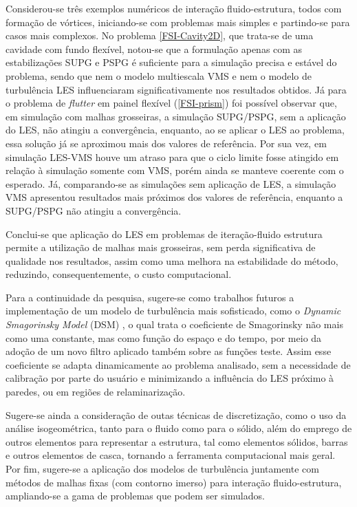 Considerou-se três exemplos numéricos de interação fluido-estrutura, todos com formação de vórtices, iniciando-se com problemas mais simples e partindo-se para casos mais complexos. No problema \ref{FSI-Cavity2D}, que trata-se de uma cavidade com fundo flexível, notou-se que a formulação apenas com as estabilizações SUPG e PSPG é suficiente para a simulação precisa e estável do problema, sendo que nem o modelo multiescala VMS e nem o modelo de turbulência LES influenciaram  significativamente nos resultados obtidos. Já para o problema de \textit{flutter} em painel flexível (\ref{FSI-prism}) foi possível observar que, em simulação com malhas grosseiras, a simulação SUPG/PSPG, sem a aplicação do LES, não atingiu a convergência, enquanto, ao se aplicar o LES ao problema, essa solução já se aproximou mais dos valores de referência. Por sua vez, em simulação LES-VMS houve um atraso para que o ciclo limite fosse atingido em relação à simulação somente com VMS, porém ainda se manteve coerente com o esperado. Já, comparando-se as simulações sem aplicação de LES, a simulação VMS apresentou resultados mais próximos dos valores de referência, enquanto a SUPG/PSPG não atingiu a convergência.

Conclui-se que aplicação do LES em problemas de iteração-fluido estrutura permite a utilização de malhas mais grosseiras, sem perda significativa de qualidade nos resultados, assim como uma melhora na estabilidade do método, reduzindo, consequentemente, o custo computacional.

Para a continuidade da pesquisa, sugere-se como trabalhos futuros a implementação de um modelo de turbulência mais sofisticado, como o \textit{Dynamic Smagorinsky Model} (DSM) \cite{germano1991dynamic}, o qual trata o coeficiente de Smagorinsky não mais como uma constante, mas como função do espaço e do tempo, por meio da adoção de um novo filtro aplicado também sobre as funções teste. Assim esse coeficiente se adapta dinamicamente ao problema analisado, sem a necessidade de calibração por parte do usuário e minimizando a influência do LES próximo à paredes, ou em regiões de relaminarização.

Sugere-se ainda a consideração de outas técnicas de discretização, como o uso da análise isogeométrica, tanto para o fluido como para o sólido, além do emprego de outros elementos para representar a estrutura, tal como elementos sólidos, barras e outros elementos de casca, tornando a ferramenta computacional mais geral. Por fim, sugere-se a aplicação dos modelos de turbulência juntamente com métodos de malhas fixas (com contorno imerso) para interação fluido-estrutura, ampliando-se a gama de problemas que podem ser simulados.